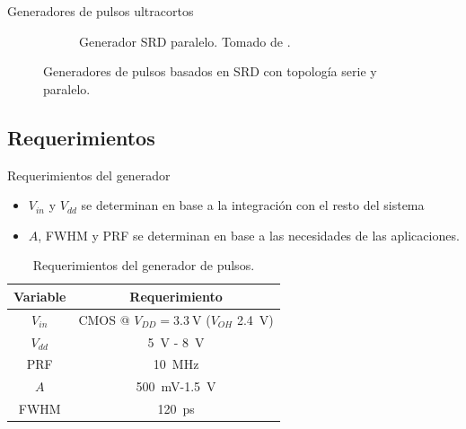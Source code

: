\documentclass{beamer}
\begin{document}
\begin{frame}{Generadores de pulsos ultracortos}
\begin{figure}
\begin{subfigure}[b]{0.45\textwidth}
            \caption{Generador SRD paralelo. Tomado de \cite{han2005}.}
            \label{fig:srd_shunt_generator}
        \end{subfigure}
        \caption{Generadores de pulsos basados en SRD con topología serie y
        paralelo.}
        \label{fig:srd_pulse_generator_topologies}
    \end{figure}

\end{frame}

\subsection{Requerimientos}

\begin{frame}{Requerimientos del generador}

    \begin{block}{}
        \begin{itemize}
            \item $V_{in}$ y $V_{dd}$ se determinan en base a la integración con el
                resto del sistema
            \item $A$, FWHM y PRF se determinan en base a las necesidades de las
                aplicaciones.
        \end{itemize}
    \end{block}

    \begin{table}
    \centering
    \begin{tabular}{c|c}
    \hline
        Variable & Requerimiento \\
    \hline
        $V_{in}$                &   CMOS @ $V_{DD}=\qty{3.3}{\volt}$ ($V_{OH}$
        \qty{2.4}{\volt})     \\
        $V_{dd}$                &   \qty{5}{\volt} - \qty{8}{\volt} \\
        PRF                &        \qty{10}{\mega\hertz} \\
        $A$                &        \qty{500}{\milli\volt}-\qty{1.5}{\volt} \\
        FWHM                &       \qty{120}{\pico\second} \\
    \hline
    \end{tabular}
    \caption{Requerimientos del generador de pulsos.}
    \label{tab:pulser_requirements}
    \end{table}

\end{frame}
\end{document}
